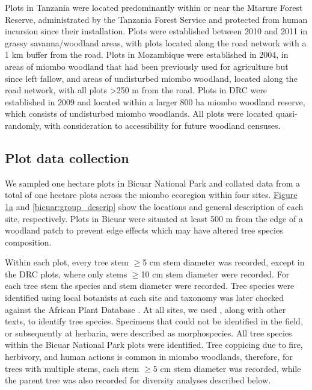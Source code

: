 \begin{refsection}
Plots in Tanzania were located predominantly within or near the Mtarure Forest Reserve, administrated by the Tanzania Forest Service and protected from human incursion since their installation. Plots were established between 2010 and 2011 in grassy savanna/woodland areas, with plots located along the road network with a 1 km buffer from the road. Plots in Mozambique were established in 2004, in areas of miombo woodland that had been previously used for agriculture but since left fallow, and areas of undisturbed miombo woodland, located along the road network, with all plots >250 m from the road. Plots in DRC were established in 2009 and located within a larger 800 ha miombo woodland reserve, which consists of undisturbed miombo woodlands. All plots were located quasi-randomly, with consideration to accessibility for future woodland censuses.

\subsection{Plot data collection}
\label{bicuar:ssec:plot_data}

We sampled \nplotsbicuar{} one hectare plots in Bicuar National Park and collated data from a total of \nplots{} one hectare plots across the miombo ecoregion within four sites. \hyperref[plot_map]{Figure 1a} and \autoref{bicuar:group_descrip} show the locations and general description of each site, respectively. Plots in Bicuar were situated at least 500 m from the edge of a woodland patch to prevent edge effects which may have altered tree species composition.

Within each plot, every tree stem $\ge$5 cm stem diameter was recorded, except in the DRC plots, where only stems $\ge$10 cm stem diameter were recorded. For each tree stem the species and stem diameter were recorded. Tree species were identified using local botanists at each site and taxonomy was later checked against the African Plant Database \citep{APD2020}. At all sites, we used \citet{Palgrave2003}, along with other texts, to identify tree species. Specimens that could not be identified in the field, or subsequently at herbaria, were described as morphospecies. All tree species within the Bicuar National Park plots were identified. Tree coppicing due to fire, herbivory, and human actions is common in miombo woodlands, therefore, for trees with multiple stems, each stem $\ge$5 cm stem diameter was recorded, while the parent tree was also recorded for diversity analyses described below.   


\end{refsection}
